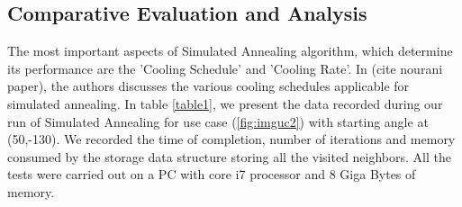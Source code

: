 \subsection{Comparative Evaluation and Analysis}
The most important aspects of Simulated Annealing algorithm, which determine its performance are the 'Cooling Schedule' and 'Cooling Rate'. In (cite nourani paper), the authors discusses the various cooling schedules applicable for simulated annealing. In table \ref{table1}, we present the data recorded during our run of Simulated Annealing for use case (\ref{fig:imguc2}) with starting angle at (50,-130). We recorded the time of completion, number of iterations and memory consumed by the storage data structure storing all the visited neighbors. All the tests were carried out on a PC with core i7 processor and 8 Giga Bytes of memory. 

